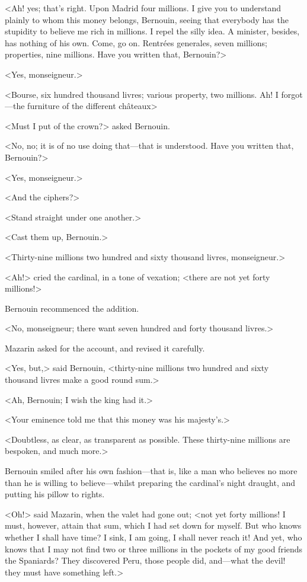 <Ah! yes; that's right. Upon Madrid four millions. I give you to understand plainly to whom this money belongs, Bernouin, seeing that everybody has the stupidity to believe me rich in millions. I repel the silly idea. A minister, besides, has nothing of his own. Come, go on. Rentrées generales, seven millions; properties, nine millions. Have you written that, Bernouin?>

<Yes, monseigneur.>

<Bourse, six hundred thousand livres; various property, two millions. Ah! I forgot—the furniture of the different châteaux\longdash>

<Must I put of the crown?> asked Bernouin.

<No, no; it is of no use doing that—that is understood. Have you written that, Bernouin?>

<Yes, monseigneur.>

<And the ciphers?>

<Stand straight under one another.>

<Cast them up, Bernouin.>

<Thirty-nine millions two hundred and sixty thousand livres, monseigneur.>

<Ah!> cried the cardinal, in a tone of vexation; <there are not yet forty millions!>

Bernouin recommenced the addition.

<No, monseigneur; there want seven hundred and forty thousand livres.>

Mazarin asked for the account, and revised it carefully.

<Yes, but,> said Bernouin, <thirty-nine millions two hundred and sixty thousand livres make a good round sum.>

<Ah, Bernouin; I wish the king had it.>

<Your eminence told me that this money was his majesty's.>

<Doubtless, as clear, as transparent as possible. These thirty-nine millions are bespoken, and much more.>

Bernouin smiled after his own fashion—that is, like a man who believes no more than he is willing to believe—whilst preparing the cardinal's night draught, and putting his pillow to rights.

<Oh!> said Mazarin, when the valet had gone out; <not yet forty millions! I must, however, attain that sum, which I had set down for myself. But who knows whether I shall have time? I sink, I am going, I shall never reach it! And yet, who knows that I may not find two or three millions in the pockets of my good friends the Spaniards? They discovered Peru, those people did, and—what the devil! they must have something left.>

